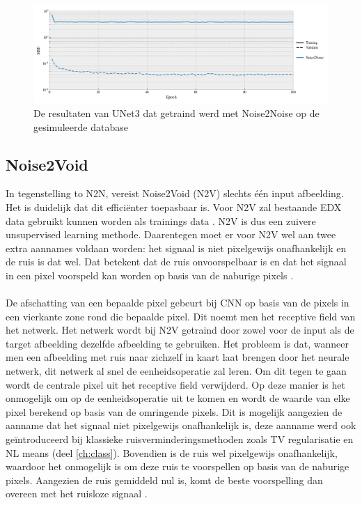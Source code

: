 \documentclass{report}
\begin{document}
\begin{figure}[h!]
	\centering
	\includegraphics[width=15cm]{images/nets/results_n2n.png}
	\caption{De resultaten van UNet3 dat getraind werd met Noise2Noise op de gesimuleerde database}
	\label{fig:nets_results_n2n}
\end{figure}

\subsection{Noise2Void}
In tegenstelling to N2N, vereist Noise2Void (N2V) slechts één input afbeelding. Het is duidelijk dat dit efficiënter toepasbaar is. Voor N2V zal bestaande EDX data gebruikt kunnen worden als trainings data \cite{paper:n2v, paper:n2s}. N2V is dus een zuivere unsupervised learning methode. Daarentegen moet er voor N2V wel aan twee extra aannames voldaan worden: het signaal is niet pixelgewijs onafhankelijk en de ruis is dat wel. Dat betekent dat de ruis onvoorspelbaar is en dat het signaal in een pixel voorspeld kan worden op basis van de naburige pixels \cite{paper:n2v, paper:n2s}.
\\ \\
De afschatting van een bepaalde pixel gebeurt bij CNN op basis van de pixels in een vierkante zone rond die bepaalde pixel. Dit noemt men het receptive field van het netwerk. Het netwerk wordt bij N2V getraind door zowel voor de input als de target afbeelding dezelfde afbeelding te gebruiken. Het probleem is dat, wanneer men een afbeelding met ruis naar zichzelf in kaart laat brengen door het neurale netwerk, dit netwerk al snel de eenheidsoperatie zal leren. Om dit tegen te gaan wordt de centrale pixel uit het receptive field verwijderd. Op deze manier is het onmogelijk om op de eenheidsoperatie uit te komen en wordt de waarde van elke pixel berekend op basis van de omringende pixels. Dit is mogelijk aangezien de aanname dat het signaal niet pixelgewijs onafhankelijk is, deze aanname werd ook geïntroduceerd bij klassieke ruisverminderingsmethoden zoals TV regularisatie en NL means (deel \ref{ch:class}). Bovendien is de ruis wel pixelgewijs onafhankelijk, waardoor het onmogelijk is om deze ruis te voorspellen op basis van de naburige pixels. Aangezien de ruis gemiddeld nul is, komt de beste voorspelling dan overeen met het ruisloze signaal \cite{paper:n2v, paper:n2s}.
\end{document}
